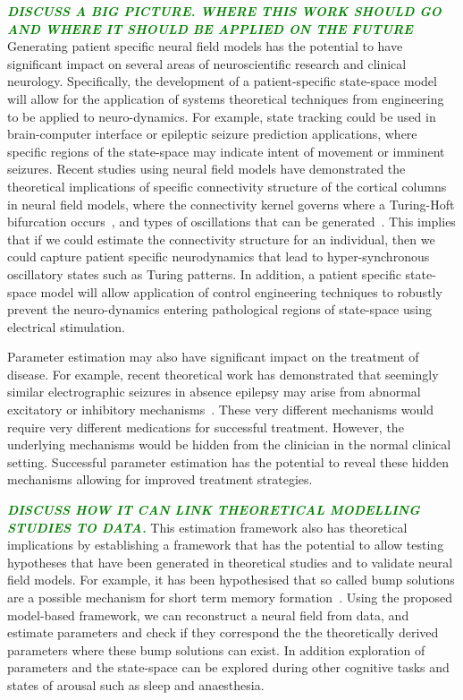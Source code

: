 \documentclass[12pt]{iopart}
\newcommand{\omg}[1]{\textsf{\emph{\textbf{\textcolor{green}{#1}}}}}
\begin{document}
\omg{DISCUSS A BIG PICTURE. WHERE THIS WORK SHOULD GO AND WHERE IT SHOULD BE APPLIED ON THE FUTURE}
Generating patient specific neural field models has the potential to have significant impact on several areas of neuroscientific research and clinical neurology. Specifically, the development of a patient-specific state-space model will allow for the application of systems theoretical techniques from engineering to be applied to neuro-dynamics. For example, state tracking could be used in brain-computer interface or epileptic seizure prediction applications, where specific regions of the state-space may indicate intent of movement or imminent seizures. Recent studies using neural field models have demonstrated the theoretical implications of specific connectivity structure of the cortical columns in neural field models, where the connectivity kernel governs where a Turing-Hoft bifurcation occurs~\cite{Hutt2005}, and types of oscillations that can be generated~\cite{Schmidt2009}. This implies that if we could estimate the connectivity structure for an individual, then we could capture patient specific neurodynamics that lead to hyper-synchronous oscillatory states such as Turing patterns. In addition, a patient specific state-space model will allow application of control engineering techniques to robustly prevent the neuro-dynamics entering pathological regions of state-space using electrical stimulation. 

Parameter estimation may also have significant impact on the treatment of disease. For example, recent theoretical work has demonstrated that seemingly similar electrographic seizures in absence epilepsy may arise from abnormal excitatory or inhibitory mechanisms~\cite{Marten2009}. These very different mechanisms would require very different medications for successful treatment. However, the underlying mechanisms would be hidden from the clinician in the normal clinical setting. Successful parameter estimation has the potential to reveal these hidden mechanisms allowing for improved treatment strategies.

\omg{DISCUSS HOW IT CAN LINK THEORETICAL MODELLING STUDIES TO DATA.}
This estimation framework also has theoretical implications by establishing a framework that has the potential to allow testing hypotheses that have been generated in theoretical studies and to validate neural field models. For example, it has been hypothesised that so called bump solutions are a possible mechanism for short term memory formation~\cite{Coombes2005}. Using the proposed model-based framework, we can reconstruct a neural field from data, and estimate parameters and check if they correspond the the theoretically derived parameters where these bump solutions can exist. In addition exploration of parameters and the state-space can be explored during other cognitive tasks and states of arousal such as sleep and anaesthesia. 
\end{document}
